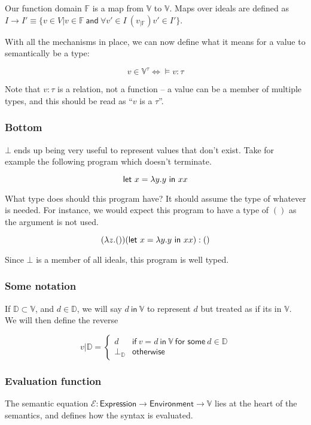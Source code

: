 Our function domain $\mathbb{F}$ is a map from $\mathbb{V}$ to
$\mathbb{V}$. Maps over ideals are defined as
$I \rightarrow I' \equiv \{ v \in V | v \in \mathbb{F} \ \mathsf{and} \ \forall v' \in I \
(v_{|\mathbb{F}})v' \in I' \}$.

With all the mechanisms in place, we can now define what it means for
a value to semantically be a type:

\[v \in \mathbb{V}^\tau \iff \vDash v : \tau\]

Note that $v : \tau$ is a relation, not a function -- a value can be a
member of multiple types, and this should be read as ``$v$ is a $\tau$''.

\subsubsection{Bottom}
$\bot$ ends up being very useful to represent values that don't exist.
Take for example the following program which doesn't terminate. 

\[\mathsf{let} \ x = \lambda y. y \ \mathsf{in} \ x x\]

What type does should this program have? It should assume the
type of whatever is needed. For instance, we would expect this program
to have a type of $()$ as the argument is not used.

$$(\lambda z. ()) (\mathsf{let} \ x = \lambda y. y \ \mathsf{in} \ x x) : ()$$

Since $\bot$ is a member of all ideals, this program is well typed.

\subsubsection{Some notation}

If $\mathbb{D} \subset \mathbb{V}$, and $d \in \mathbb{D}$, we will say $d \ \mathsf{in} \
\mathbb{V}$ to represent $d$ but treated as if its in $\mathbb{V}$. \\
We will then define the reverse

$$v | \mathbb{D} =
\begin{cases}
  d & \textsf{if} \ v = d \ \textsf{in} \ \mathbb{V} \ \textsf{for
    some} \ d \in \mathbb{D} \\
  \bot_{\mathbb{D}} & \textsf{otherwise}
\end{cases}
$$


\subsubsection{Evaluation function}
The semantic equation $\mathcal{E} : \mathsf{Expression} \rightarrow
\mathsf{Environment} \rightarrow \mathbb{V}$ lies at the heart of the semantics,
and defines how the syntax is evaluated.

